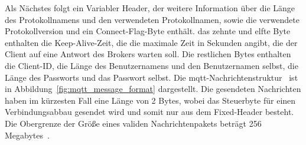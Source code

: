 Als Nächstes folgt ein Variabler Header, der weitere Information über die Länge des Protokollnamens und den verwendeten
Protokollnamen, sowie die verwendete Protokollversion und ein Connect-Flag-Byte enthält.
das zehnte und elfte Byte enthalten die Keep-Alive-Zeit, die die maximale Zeit in Sekunden angibt, die der Client auf eine
Antwort des Brokers warten soll.
Die restlichen Bytes enthalten die Client-ID, die Länge des Benutzernamens und den Benutzernamen selbst, die
Länge des Passworts und das Passwort selbst.
Die \gls{mqtt}-Nachrichtenstruktur~\cite{mqtt} ist in Abbildung~\ref{fig:mqtt_message_format} dargestellt.
\newline
Die gesendeten Nachrichten haben im kürzesten Fall eine Länge von 2 Bytes, wobei das Steuerbyte für einen Verbindungsabbau
gesendet wird und somit nur aus dem Fixed-Header besteht.
Die Obergrenze der Größe eines validen Nachrichtenpakets beträgt 256 Megabytes~\cite{mqtt}.